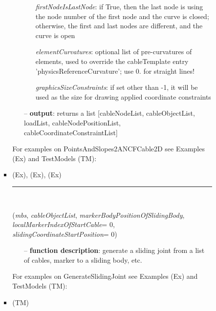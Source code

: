 \begin{itemize}[leftmargin=1.4cm]
\begin{itemize}[leftmargin=1.4cm]
\begin{itemize}[leftmargin=0.5cm]
\begin{itemize}[leftmargin=1.4cm]
\begin{itemize}[leftmargin=0.7cm]
\begin{itemize}[leftmargin=1.2cm]
    \item[] {\it   firstNodeIsLastNode}: if True, then the last node is using the node number of the first node and the curve is closed; otherwise, the first and last nodes are different, and the curve is open
    \item[] {\it   elementCurvatures}: optional list of pre-curvatures of elements, used to override the cableTemplate entry 'physicsReferenceCurvature'; use 0. for straight lines!
    \item[] {\it   graphicsSizeConstraints}: if set other than -1, it will be used as the size for drawing applied coordinate constraints
  \end{itemize}
  \item[--]  {\bf output}: returns a list [cableNodeList, cableObjectList, loadList, cableNodePositionList, cableCoordinateConstraintList]\vspace{12pt}\end{itemize}
%
%
\noindent For examples on PointsAndSlopes2ANCFCable2D see Examples (Ex) and TestModels (TM):
\bi
 \item \footnotesize {} (Ex), 
 (Ex), 
 (Ex)\ei

%
\noindent\rule{8cm}{0.75pt}\vspace{1pt} \\ 
\begin{flushleft}
\label{sec:beams:GenerateSlidingJoint}
({\it mbs}, {\it cableObjectList}, {\it markerBodyPositionOfSlidingBody}, {\it localMarkerIndexOfStartCable}= 0, {\it slidingCoordinateStartPosition}= 0)
\end{flushleft}
\setlength{\itemindent}{0.7cm}
\begin{itemize}[leftmargin=0.7cm]
  \item[--]  {\bf function description}: generate a sliding joint from a list of cables, marker to a sliding body, etc.\vspace{12pt}\end{itemize}
%
%
\noindent For examples on GenerateSlidingJoint see Examples (Ex) and TestModels (TM):
\bi
 \item \footnotesize {} (TM)\ei


\end{itemize}
\end{itemize}
\end{itemize}
\end{itemize}
